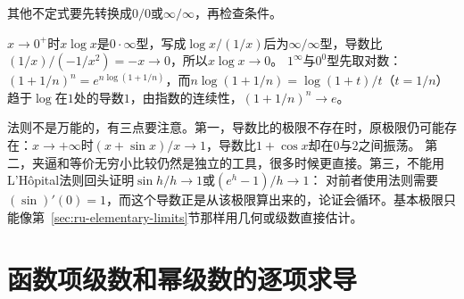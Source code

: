 其他不定式要先转换成$0/0$或$\infty/\infty$，再检查条件。
\begin{example}
\label{ex:ru-other-indeterminate-forms}
$x\to0^+$时$x\log x$是$0\cdot\infty$型，写成$\log x/(1/x)$后为$\infty/\infty$型，导数比$(1/x)/(-1/x^2)=-x\to0$，所以$x\log x\to0$。
$1^\infty$与$0^0$型先取对数：$(1+1/n)^n=e^{n\log(1+1/n)}$，而$n\log(1+1/n)=\log(1+t)/t$（$t=1/n$）趋于$\log$在$1$处的导数$1$，由指数的连续性，$(1+1/n)^n\to e$。
\end{example}

法则不是万能的，有三点要注意。第一，导数比的极限不存在时，原极限仍可能存在：$x\to+\infty$时$(x+\sin x)/x\to1$，导数比$1+\cos x$却在$0$与$2$之间振荡。
第二，夹逼和等价无穷小比较仍然是独立的工具，很多时候更直接。第三，不能用L'Hôpital法则回头证明$\sin h/h\to1$或$(e^h-1)/h\to1$：
对前者使用法则需要$(\sin)'(0)=1$，而这个导数正是从该极限算出来的，论证会循环。基本极限只能像第~\ref{sec:ru-elementary-limits}节那样用几何或级数直接估计。
\section{函数项级数和幂级数的逐项求导}
\label{sec:ru-termwise-differentiation}

